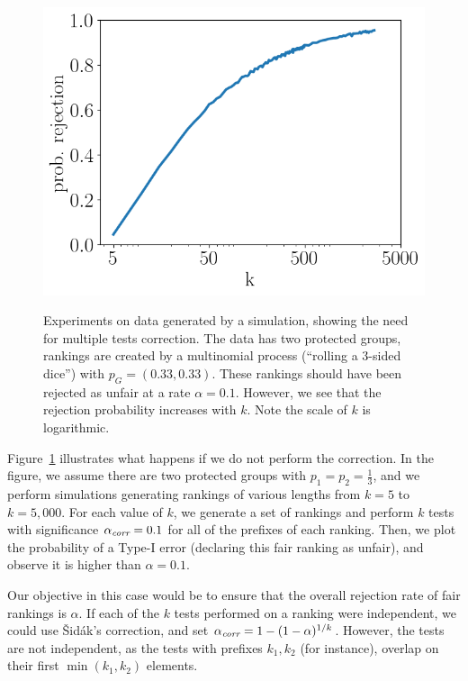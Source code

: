 \begin{figure}[t]
	\centering
	{\includegraphics[width=.48\textwidth]{pics/failProbPlotMultinom.png}}
	\CaptionMargin
	\caption{Experiments on data generated by a simulation, showing the need for multiple tests correction.
		The data has two protected groups, rankings are created by a multinomial process (``rolling a 3-sided dice'') with $p_G = (0.33, 0.33)$.
		These rankings should have been rejected as unfair at a rate $\alpha = 0.1$.
		However, we see that the rejection probability increases with $k$.
		Note the scale of $k$ is logarithmic.}
	\label{fig:why-adjustment-is-needed-multinomial}
\end{figure}

Figure~\ref{fig:why-adjustment-is-needed-multinomial} illustrates what happens if we do not perform the correction.
%
In the figure, we assume there are two protected groups with $p_1=p_2=\frac{1}{3}$, and we perform simulations generating rankings of various lengths from $k=5$ to $k=5,000$.
%
For each value of $k$, we generate a set of rankings and perform $k$ tests with significance $\alpha_\textit{corr}=0.1$ for all of the prefixes of each ranking.
%
Then, we plot the probability of a Type-I error (declaring this fair ranking as unfair), and observe it is higher than $\alpha = 0.1$.
%

Our objective in this case would be to ensure that the overall rejection rate of fair rankings is $\alpha$.
%
If each of the $k$ tests performed on a ranking were independent, we could use {\v S}id{\'a}k's correction, and set $\alpha_\textit{corr} = 1 - (1 - \alpha)^{1/k}$.
%
However, the tests are not independent, as the tests with prefixes $k_1, k_2$ (for instance), overlap on their first $\min(k_1, k_2)$ elements.
%

